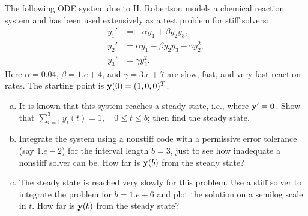 \begin{problem}[A\&P 5.9]
  The following ODE system due to H. Robertson models a chemical reaction system and has been used extensively as a test problem for stiff solvers:
  \begin{align*}
    y_1' &= -\alpha y_1 + \beta y_2 y_3, \\
    y_2' &= \alpha y_1 - \beta y_2 y_3 - \gamma y_2^2, \\
    y_3' &= \gamma y_2^2.
  \end{align*}
  Here $\alpha = 0.04$, $\beta = 1.e + 4$, and $\gamma = 3.e + 7$ are slow, fast, and very fast reaction rates. The starting point is $\mathbf{y}(0) = (1,0,0)^T$.
  \begin{enumerate}[(a)]
    \item It is known that this system reaches a steady state, i.e., where $\mathbf{y}' = \mathbf{0}$. Show that $\sum_{i=1}^3 y_i(t) = 1,\quad 0 \leq t \leq b$; then find the steady state.
    \item Integrate the system using a nonstiff code with a permissive error tolerance (say $1.e - 2$) for the interval length $b = 3$, just to see how inadequate a nonstiff solver can be. How far is $\mathbf{y}(b)$ from the steady state?
    \item The steady state is reached very slowly for this problem. Use a stiff solver to integrate the problem for $b = 1.e + 6$ and plot the solution on a semilog scale in $t$. How far is $\mathbf{y}(b)$ from the steady state?
  \end{enumerate}
\end{problem}

\FloatBarrier

\begin{solution}
  
\end{solution}